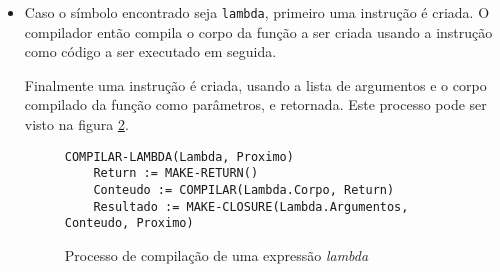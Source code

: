 \begin{itemize}
\begin{itemize}
 Então uma instrução  é criada usando a expressão compilada 
 anteriormente como código seguinte e uma instrução  é criada usando
 a instrução  criada como código seguinte.
 
 Finalmente, se o código recebido no início da compilação como código a ser
 executado em seguida for uma instrução , ou seja, isto é parte de 
 uma chamada terminal, a instrução  criada anteriormente é retornada.
 Caso contrário, uma instrução  é criada usando o código recebido
 no início da compilação e a instrução  criada como parâmetros, e esta
 instrução  é retornada. Este processo pode ser visto com mais 
 detalhes na figura \ref{fig:compile-save}.

\begin{figure}
\begin{lstlisting}
COMPILAR-CALL/CC(Call/CC, Proximo)
    Apply := MAKE-APPLY()
    Expressao := COMPILAR(Call/CC.Expressao, Apply)
    Argument := MAKE-ARGUMENT(Expressao)
    Save := MAKE-SAVE(Argument)

    IF IS-RETURN(Proximo) THEN
        Resultado := Save
    ELSE
        Resultado := MAKE-FRAME(Proximo, Save)
\end{lstlisting}
\caption{Processo de compilação de uma criação de continuação.}
\label{fig:compile-save}
\end{figure}

 \item Caso o símbolo encontrado seja \texttt{lambda}, primeiro uma instrução
  é criada. O compilador então compila o corpo da função a ser
 criada usando a instrução  como código a ser executado em seguida.
 
 Finalmente uma instrução  é criada, usando a lista de argumentos e
 o corpo compilado da função como parâmetros, e retornada. Este processo pode ser
 visto na figura \ref{fig:compile-lambda}.

\begin{figure}
\begin{lstlisting}
COMPILAR-LAMBDA(Lambda, Proximo)
    Return := MAKE-RETURN()
    Conteudo := COMPILAR(Lambda.Corpo, Return)
    Resultado := MAKE-CLOSURE(Lambda.Argumentos, Conteudo, Proximo)
\end{lstlisting}
\caption{Processo de compilação de uma expressão \textit{lambda}}
\label{fig:compile-lambda}
\end{figure}
\end{itemize}


\end{itemize}
